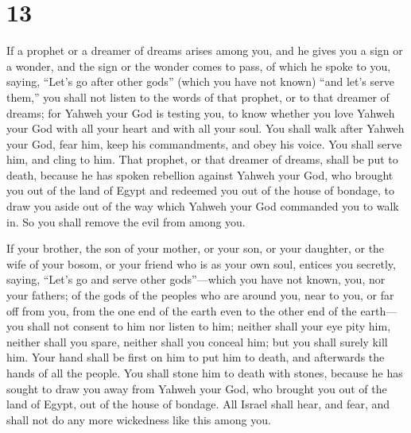 \hypertarget{section-12}{%
\section{13}\label{section-12}}

 If a prophet or a dreamer of dreams arises among you, and
he gives you a sign or a wonder,  and the sign or the wonder
comes to pass, of which he spoke to you, saying, ``Let's go after other
gods'' (which you have not known) ``and let's serve them,'' 
you shall not listen to the words of that prophet, or to that dreamer of
dreams; for Yahweh your God is testing you, to know whether you love
Yahweh your God with all your heart and with all your soul. 
You shall walk after Yahweh your God, fear him, keep his commandments,
and obey his voice. You shall serve him, and cling to him. 
That prophet, or that dreamer of dreams, shall be put to death, because
he has spoken rebellion against Yahweh your God, who brought you out of
the land of Egypt and redeemed you out of the house of bondage, to draw
you aside out of the way which Yahweh your God commanded you to walk in.
So you shall remove the evil from among you.

 If your brother, the son of your mother, or your son, or
your daughter, or the wife of your bosom, or your friend who is as your
own soul, entices you secretly, saying, ``Let's go and serve other
gods''---which you have not known, you, nor your fathers; 
of the gods of the peoples who are around you, near to you, or far off
from you, from the one end of the earth even to the other end of the
earth---  you shall not consent to him nor listen to him;
neither shall your eye pity him, neither shall you spare, neither shall
you conceal him;  but you shall surely kill him. Your hand
shall be first on him to put him to death, and afterwards the hands of
all the people.  You shall stone him to death with stones,
because he has sought to draw you away from Yahweh your God, who brought
you out of the land of Egypt, out of the house of bondage. 
All Israel shall hear, and fear, and shall not do any more wickedness
like this among you.

